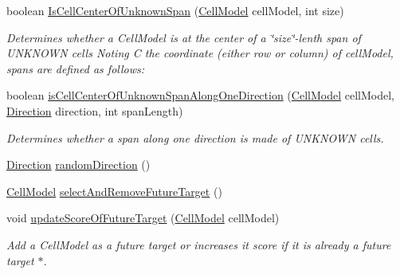 \begin{DoxyCompactItemize}
boolean \hyperlink{classbattleship2D_1_1ui_1_1BoardUIComputer_a6f52a41b7ac76ca87f14f14e9c03860a}{Is\-Cell\-Center\-Of\-Unknown\-Span} (\hyperlink{classbattleship2D_1_1model_1_1CellModel}{Cell\-Model} cell\-Model, int size)
\begin{DoxyCompactList}\small\item\em Determines whether a Cell\-Model is at the center of a \char`\"{}size\char`\"{}-\/lenth span of U\-N\-K\-N\-O\-W\-N cells Noting C the coordinate (either row or column) of cell\-Model, spans are defined as follows\-: \end{DoxyCompactList}\item 
boolean \hyperlink{classbattleship2D_1_1ui_1_1BoardUIComputer_a4f83a91ccb9c8ea87e66e413f0d85e70}{is\-Cell\-Center\-Of\-Unknown\-Span\-Along\-One\-Direction} (\hyperlink{classbattleship2D_1_1model_1_1CellModel}{Cell\-Model} cell\-Model, \hyperlink{enumbattleship2D_1_1model_1_1Direction}{Direction} direction, int span\-Length)
\begin{DoxyCompactList}\small\item\em Determines whether a span along one direction is made of U\-N\-K\-N\-O\-W\-N cells. \end{DoxyCompactList}\item 
\hyperlink{enumbattleship2D_1_1model_1_1Direction}{Direction} \hyperlink{classbattleship2D_1_1ui_1_1BoardUIComputer_ab022a170309c399025e12739cdd58617}{random\-Direction} ()
\item 
\hyperlink{classbattleship2D_1_1model_1_1CellModel}{Cell\-Model} \hyperlink{classbattleship2D_1_1ui_1_1BoardUIComputer_a10da37bcc8fb42cf582ad6903441b722}{select\-And\-Remove\-Future\-Target} ()
\item 
void \hyperlink{classbattleship2D_1_1ui_1_1BoardUIComputer_ae89828da98cd56e91741bb91a191931d}{update\-Score\-Of\-Future\-Target} (\hyperlink{classbattleship2D_1_1model_1_1CellModel}{Cell\-Model} cell\-Model)
\begin{DoxyCompactList}\small\item\em Add a Cell\-Model as a future target or increases it score if it is already a future target $\ast$. \end{DoxyCompactList}\end{DoxyCompactItemize}
